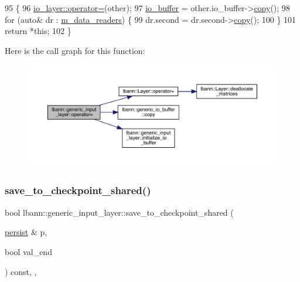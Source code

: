 \begin{DoxyCode}
95                                                                    \{
96     \hyperlink{classlbann_1_1Layer_a00d8acde68fda2f38c4a39ef8c89234a}{io\_layer::operator=}(other);
97     \hyperlink{classlbann_1_1generic__input__layer_a9dfe8b9afaebc7a5bcb0177ee2ab428f}{io\_buffer} = other.io\_buffer->\hyperlink{classlbann_1_1generic__io__buffer_a9d8020b82cf467c9148b0b37e7229262}{copy}();
98     \textcolor{keywordflow}{for} (\textcolor{keyword}{auto}& dr : \hyperlink{classlbann_1_1generic__input__layer_a6bc18860c02beed0252ea3cc87bc48d2}{m\_data\_readers}) \{
99       dr.second = dr.second->\hyperlink{classlbann_1_1generic__io__buffer_a9d8020b82cf467c9148b0b37e7229262}{copy}();
100     \}
101     \textcolor{keywordflow}{return} *\textcolor{keyword}{this};
102   \}
\end{DoxyCode}
Here is the call graph for this function\+:\nopagebreak
\begin{figure}[H]
\begin{center}
\leavevmode
\includegraphics[width=350pt]{classlbann_1_1generic__input__layer_a76d36777d01144cafe7b33ab5ce739d2_cgraph}
\end{center}
\end{figure}
\mbox{\label{classlbann_1_1generic__input__layer_abae61e13f47205491a43e4842808945d}} 
\subsubsection{\texorpdfstring{save\+\_\+to\+\_\+checkpoint\+\_\+shared()}{save\_to\_checkpoint\_shared()}}
{\footnotesize\ttfamily bool lbann\+::generic\+\_\+input\+\_\+layer\+::save\+\_\+to\+\_\+checkpoint\+\_\+shared (\begin{DoxyParamCaption}\item[{\hyperlink{classlbann_1_1persist}{persist} \&}]{p,  }\item[{bool}]{val\+\_\+end }\end{DoxyParamCaption}) const\hspace{0.3cm}{\ttfamily [inline]}, {\ttfamily [override]}, {\ttfamily [virtual]}}




